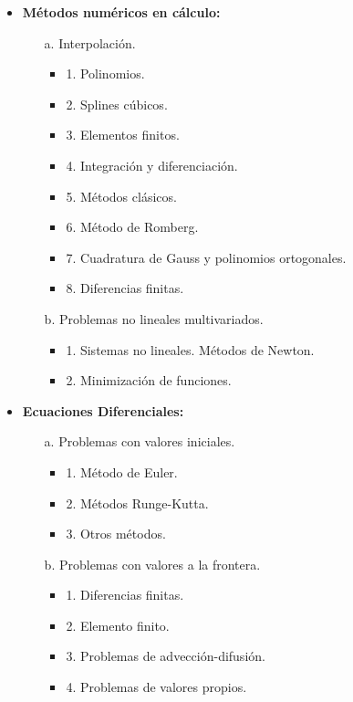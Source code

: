 \documentclass[10pt,a4paper]{article}
\begin{document}
\begin{itemize}
    \item \textbf{Métodos numéricos en cálculo:}
    \begin{itemize}
        \item[a.] Interpolación.
        \begin{itemize}
            \item 1. Polinomios.
            \item 2. Splines cúbicos.
            \item 3. Elementos finitos.
            \item 4. Integración y diferenciación.
            \item 5. Métodos clásicos.
            \item 6. Método de Romberg.
            \item 7. Cuadratura de Gauss y polinomios ortogonales.
            \item 8. Diferencias finitas.
        \end{itemize}
        \item[b.] Problemas no lineales multivariados.
        \begin{itemize}
            \item 1. Sistemas no lineales. Métodos de Newton.
            \item 2. Minimización de funciones.
        \end{itemize}
    \end{itemize}

    \item \textbf{Ecuaciones Diferenciales:}
    \begin{itemize}
        \item[a.] Problemas con valores iniciales.
        \begin{itemize}
            \item 1. Método de Euler.
            \item 2. Métodos Runge-Kutta.
            \item 3. Otros métodos.
        \end{itemize}
        \item[b.] Problemas con valores a la frontera.
        \begin{itemize}
            \item 1. Diferencias finitas.
            \item 2. Elemento finito.
            \item 3. Problemas de advección-difusión.
            \item 4. Problemas de valores propios.
        \end{itemize}
    \end{itemize}
\end{itemize}
\end{document}
